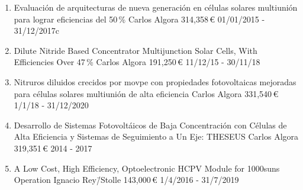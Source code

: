 \begin{enumerate}[leftmargin=2.5mm, labelsep=-5mm]
	\setcounter{enumi}{0}

\item \begin{project}
	{Evaluación de arquitecturas de nueva generación en células solares multiunión para lograr eficiencias del 50\,\%}
	{Carlos Algora}
	{314,358\,\euro}
	{01/01/2015 - 31/12/2017}c
	\end{project}

\item \begin{project}
	{Dilute Nitride Based Concentrator Multijunction Solar Cells, With Efficiencies Over 47\,\%}
	{Carlos Algora}
	{191,250\,\euro}
	{11/12/15 - 30/11/18}
	\end{project}
	
\item \begin{project}
	{Nitruros diluidos crecidos por \gls{movpe} con propiedades fotovoltaicas mejoradas para células solares multiunión de alta eficiencia}
	{Carlos Algora}
	{331,540\,\euro}
	{1/1/18 - 31/12/2020}
	\end{project}
	
\item \begin{project}
	{Desarrollo de Sistemas Fotovoltáicos de Baja Concentración con Células de Alta Eficiencia y Sistemas de Seguimiento a Un Eje: THESEUS}
	{Carlos Algora}
	{319,351\,\euro}
	{2014 - 2017}
	\end{project}

\item \begin{project}
	{A Low Cost, High Efficiency, Optoelectronic HCPV Module for 1000\gls{suns} Operation}
	{Ignacio Rey\=/Stolle}
	{143,000\,\euro}
	{1/4/2016 - 31/7/2019}
	\end{project}
\end{enumerate}